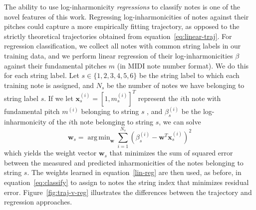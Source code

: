 \documentclass[12pt]{cmuthesis}
\DeclareMathOperator*{\argmin}{arg\,min}
\begin{document}
The ability to use log-inharmonicity \textit{regressions} to classify notes is one of the novel features of this work. Regressing log-inharmonicities of notes against their pitches could capture a more empirically fitting trajectory, as opposed to the strictly theoretical trajectories obtained from equation~\eqref{eq:linear-traj}. For regression classification, we collect all notes with common string labels in our training data, and we perform linear regression of their log-inharmonicities $\beta$ against their fundamental pitches $m$ (in MIDI note number format). We do this for each string label. Let $s \in \{1,2,3,4,5,6\}$ be the string label to which each training note is assigned, and $N_s$ be the number of notes we have belonging to string label $s$. If we let $\mathbf{x}_s^{(i)} = [1, m_s^{(i)}]^T$ represent the $i$th note with fundamental pitch $m^{(i)}$ belonging to string $s$ , and $\beta_s^{(i)}$ be the log-inharmonicity of the $i$th note belonging to string $s$, we can solve
\begin{equation}
\label{lin-reg}
\mathbf{w}_s = \argmin_{\mathbf{w}}{\sum_{i=1}^{N_s}{(\beta^{(i)}_s - \mathbf{w}^T\mathbf{x}^{(i)}_s)^2}}
\end{equation}
which yields the weight vector $\mathbf{w}_s$ that minimizes the sum of squared error between the measured and predicted inharmonicities of the notes belonging to string $s$. The weights learned in equation~\eqref{lin-reg} are then used, as before, in equation~\eqref{eq:classify} to assign to notes the string index that minimizes residual error. Figure~\ref{fig:traj-v-reg} illustrates the differences between the trajectory and regression approaches.
\end{document}
